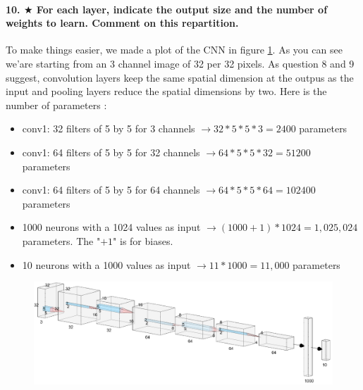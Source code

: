 \documentclass{article}
\theoremstyle{plain}%
\theoremstyle{definition}
\theoremstyle{remark}
\begin{document}
\paragraph{10. $ \bigstar $ For each layer, indicate the output size and the number of weights to learn. Comment on this repartition.}
To make things easier, we made a plot of the CNN in figure \ref{AlexNetstylelog}. As you can see we'are starting from an 3 channel image of 32 per 32 pixels. As question 8 and 9 suggest, convolution layers keep the same spatial dimension at the outpus as the input and pooling layers reduce the spatial dimensions by two. 
Here is the number of parameters : 
\begin{itemize}
    \item conv1: 32 filters of 5 by 5 for 3 channels $\rightarrow 32*5*5*3 = 2400$ parameters
    \item conv1: 64 filters of 5 by 5 for 32 channels $\rightarrow 64*5*5*32 = 51200$ parameters
    \item conv1: 64 filters of 5 by 5 for 64 channels $\rightarrow 64*5*5*64 = 102400$ parameters
    \item 1000 neurons with a 1024 values as input $\rightarrow (1000 + 1)*1024=1,025,024$ parameters. The "$+1$" is for biases.
    \item 10 neurons with a 1000 values as input $\rightarrow 11*1000=11,000$ parameters
\end{itemize}
\begin{figure}[!htbp]
    \centering
    \includegraphics*[width=\textwidth]{figs/AlexNet_style_log.png}
    \caption{}
    \label{AlexNetstylelog}
\end{figure}
\end{document}
